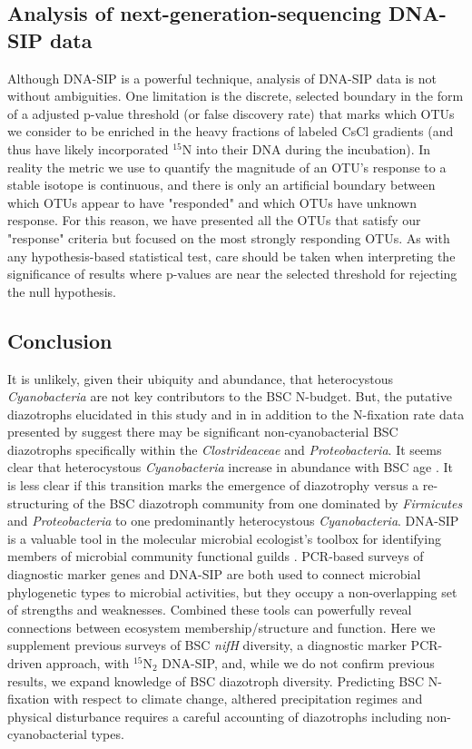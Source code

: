 \subsection{Analysis of next-generation-sequencing DNA-SIP data} Although
DNA-SIP is a powerful technique, analysis of DNA-SIP data is not without
ambiguities. One limitation is the discrete, selected boundary in the form of a
adjusted p-value threshold (or false discovery rate) that marks
which OTUs we consider to be enriched in the heavy fractions of labeled CsCl
gradients (and thus have likely incorporated $^{15}$N into their DNA during
the incubation). In reality the metric we use to quantify the magnitude of an
OTU's response to a stable isotope is continuous, and there is only an
artificial boundary between which OTUs appear to have "responded" and which
OTUs have unknown response. For this reason, we have presented all the OTUs
that satisfy our "response" criteria but focused on the most strongly
responding OTUs. As with any hypothesis-based statistical test, care should
be taken when interpreting the significance of results where p-values are
near the selected threshold for rejecting the null hypothesis.

\subsection{Conclusion}
It is unlikely, given their ubiquity and abundance, that
heterocystous \textit{Cyanobacteria} are not key contributors to the BSC
N-budget. But, the putative diazotrophs elucidated in this study and in
\citet{Steppe_1996} in addition to the N-fixation rate data presented by
\citep{15643930} suggest there may be significant
non-cyanobacterial BSC diazotrophs specifically within the
\textit{Clostrideaceae} and \textit{Proteobacteria}. It seems clear that
heterocystous \textit{Cyanobacteria} increase in abundance with BSC age
\citep{14766579}. It is less clear if this transition marks the emergence of
diazotrophy versus a re-structuring of the BSC diazotroph community from one
dominated by \textit{Firmicutes} and \textit{Proteobacteria} to one
predominantly heterocystous \textit{Cyanobacteria}. DNA-SIP is a valuable tool in the
molecular microbial ecologist's toolbox for identifying members of microbial
community functional guilds \citep{17446886}. PCR-based surveys of diagnostic
marker genes and DNA-SIP are both used to connect microbial phylogenetic
types to microbial activities, but they occupy a non-overlapping set of
strengths and weaknesses.  Combined these tools can powerfully reveal
connections between ecosystem membership/structure and function. Here we
supplement previous surveys of BSC \textit{nifH} diversity, a diagnostic
marker PCR-driven approach, with $^{15}$N$_{2}$ DNA-SIP, and, while we do not
confirm previous results, we expand knowledge of BSC diazotroph diversity.
Predicting BSC N-fixation with respect to climate change, althered 
precipitation regimes and physical disturbance requires a careful accounting of
diazotrophs including non-cyanobacterial types. 
